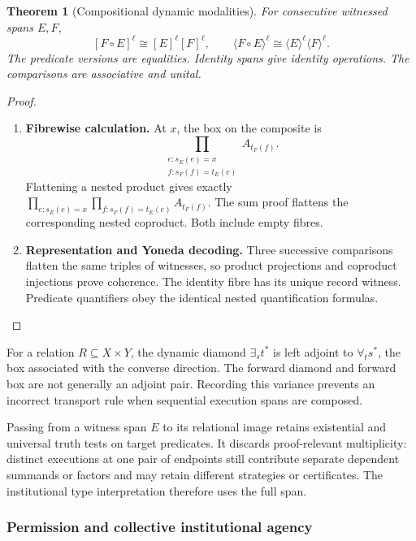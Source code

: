 \documentclass[11pt,a4paper]{article}
\numberwithin{equation}{section}
\newtheorem{theorem}{Theorem}[section]
\theoremstyle{definition}
\theoremstyle{remark}
\theoremstyle{plain}
\begin{document}
\begin{theorem}[Compositional dynamic modalities]
\label{agt-thm-dynamics}
For consecutive witnessed spans $E,F$,
\[
 [F\circ E]^\ell\cong[E]^\ell[F]^\ell,
 \qquad
 \langle F\circ E\rangle^\ell
 \cong\langle E\rangle^\ell\langle F\rangle^\ell.
\]
The predicate versions are equalities. Identity spans give identity
operations. The comparisons are associative and unital.
\end{theorem}
\begin{proof}
\leavevmode
\begin{enumerate}[label=\textup{(\arabic*)},leftmargin=*,itemsep=4pt,topsep=3pt]
  \item \textbf{Fibrewise calculation.} At $x$, the box on the composite is
\[
 \prod_{\substack{e:s_E(e)=x\\ f:s_F(f)=t_E(e)}}A_{t_F(f)}.
\]
Flattening a nested product gives exactly
$\prod_{e:s_E(e)=x}\prod_{f:s_F(f)=t_E(e)}A_{t_F(f)}$. The sum proof flattens the corresponding nested coproduct. Both include
empty fibres.
  \item \textbf{Representation and Yoneda decoding.} Three successive comparisons flatten the same triples of
witnesses, so product projections and coproduct injections prove coherence. The identity fibre has its unique record witness. Predicate quantifiers
obey the identical nested quantification formulas.
\end{enumerate}
\end{proof}

For a relation $R\subseteq X\times Y$, the dynamic diamond
$\exists_s t^*$ is left adjoint to $\forall_t s^*$, the box
associated with the converse direction. The forward diamond and
forward box are not generally an adjoint pair. Recording this variance
prevents an incorrect transport rule when sequential execution spans
are composed.

Passing from a witness span $E$ to its relational image retains
existential and universal truth tests on target predicates. It discards
proof-relevant multiplicity: distinct executions at one pair of
endpoints still contribute separate dependent summands or factors and
may retain different strategies or certificates. The institutional
type interpretation therefore uses the full span.

\subsubsection{Permission and collective institutional agency}
\end{document}
